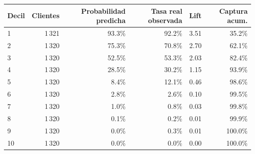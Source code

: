 \begin{tabular}{@{}lrrrrr@{}}
\toprule
\textbf{Decil} & \textbf{Clientes} & \textbf{Probabilidad predicha} & \textbf{Tasa real observada} & \textbf{Lift} & \textbf{Captura acum.} \\
\midrule
1 & 1\,321 & 93.3\% & 92.2\% & 3.51 & 35.2\% \\
2 & 1\,320 & 75.3\% & 70.8\% & 2.70 & 62.1\% \\
3 & 1\,320 & 52.5\% & 53.3\% & 2.03 & 82.4\% \\
4 & 1\,320 & 28.5\% & 30.2\% & 1.15 & 93.9\% \\
5 & 1\,320 & 8.4\% & 12.1\% & 0.46 & 98.6\% \\
6 & 1\,320 & 2.8\% & 2.6\% & 0.10 & 99.5\% \\
7 & 1\,320 & 1.0\% & 0.8\% & 0.03 & 99.8\% \\
8 & 1\,320 & 0.1\% & 0.2\% & 0.01 & 99.9\% \\
9 & 1\,320 & 0.0\% & 0.3\% & 0.01 & 100.0\% \\
10 & 1\,320 & 0.0\% & 0.0\% & 0.00 & 100.0\% \\
\bottomrule
\end{tabular}